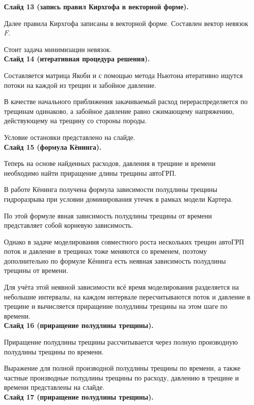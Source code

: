 \documentclass[a4paper, 12pt]{article}
\begin{document}
\textbf{Слайд 13 (запись правил Кирхгофа в векторной форме).}

Далее правила Кирхгофа записаны в векторной форме.
Составлен вектор невязок $F$.

Стоит задача минимизации невязок.\\

\textbf{Слайд 14 (итеративная процедура решения).}

Составляется матрица Якоби и с помощью метода Ньютона итеративно ищутся потоки на каждой из трещин и забойное давление.

В качестве начального приближения закачиваемый расход перераспределяется по трещинам одинаково, а забойное давление равно сжимающему напряжению, действующему на трещину со стороны породы.

Условие остановки представлено на слайде.\\

\textbf{Слайд 15 (формула Кёнинга).}

Теперь на основе найденных расходов, давления в трещине и времени необходимо найти приращение длины трещины автоГРП.

В работе Кёнинга получена формула зависимости полудлины трещины гидроразрыва при условии доминирования утечек в рамках модели Картера.

По этой формуле явная зависимость полудлины трещины от времени представляет собой корневую зависимость.

Однако в задаче моделирования совместного роста нескольких трещин автоГРП поток и давление в трещинах тоже меняются со временем, поэтому дополнительно по формуле Кёнинга есть неявная зависимость полудлины трещины от времени.

Для учёта этой неявной зависимости всё время моделирования разделяется на небольшие интервалы, на каждом интервале пересчитываются поток и давление в трещине и вычисляется приращение полудлины трещины на этом шаге по времени.\\

\textbf{Слайд 16 (приращение полудлины трещины).}

Приращение полудлины трещины рассчитывается через полную производную полудлины трещины по времени.

Выражение для полной производной полудлины трещины по времени, а также частные производные полудлины трещины по расходу, давлению в трещине и времени представлены на слайде.\\

\textbf{Слайд 17 (приращение полудлины трещины).}
\end{document}
